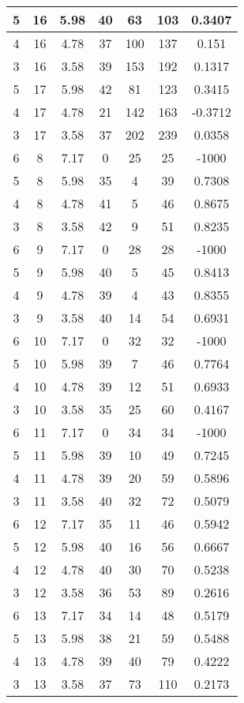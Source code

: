 \documentclass[letterpaper, 12pt]{article}
\begin{document}
\begin{longtable}{|c|c|c|c|c|c|c|}
\hline
5 & 16 & 5.98 & 40 & 63 & 103 & 0.3407 \\
\hline
4 & 16 & 4.78 & 37 & 100 & 137 & 0.151 \\
\hline
3 & 16 & 3.58 & 39 & 153 & 192 & 0.1317 \\
\hline
5 & 17 & 5.98 & 42 & 81 & 123 & 0.3415 \\
\hline
4 & 17 & 4.78 & 21 & 142 & 163 & -0.3712 \\
\hline
3 & 17 & 3.58 & 37 & 202 & 239 & 0.0358 \\
\hline
6 & 8 & 7.17 & 0 & 25 & 25 & -1000 \\
\hline
5 & 8 & 5.98 & 35 & 4 & 39 & 0.7308 \\
\hline
4 & 8 & 4.78 & 41 & 5 & 46 & 0.8675 \\
\hline
3 & 8 & 3.58 & 42 & 9 & 51 & 0.8235 \\
\hline
6 & 9 & 7.17 & 0 & 28 & 28 & -1000 \\
\hline
5 & 9 & 5.98 & 40 & 5 & 45 & 0.8413 \\
\hline
4 & 9 & 4.78 & 39 & 4 & 43 & 0.8355 \\
\hline
3 & 9 & 3.58 & 40 & 14 & 54 & 0.6931 \\
\hline
6 & 10 & 7.17 & 0 & 32 & 32 & -1000 \\
\hline
5 & 10 & 5.98 & 39 & 7 & 46 & 0.7764 \\
\hline
4 & 10 & 4.78 & 39 & 12 & 51 & 0.6933 \\
\hline
3 & 10 & 3.58 & 35 & 25 & 60 & 0.4167 \\
\hline
6 & 11 & 7.17 & 0 & 34 & 34 & -1000 \\
\hline
5 & 11 & 5.98 & 39 & 10 & 49 & 0.7245 \\
\hline
4 & 11 & 4.78 & 39 & 20 & 59 & 0.5896 \\
\hline
3 & 11 & 3.58 & 40 & 32 & 72 & 0.5079 \\
\hline
6 & 12 & 7.17 & 35 & 11 & 46 & 0.5942 \\
\hline
5 & 12 & 5.98 & 40 & 16 & 56 & 0.6667 \\
\hline
4 & 12 & 4.78 & 40 & 30 & 70 & 0.5238 \\
\hline
3 & 12 & 3.58 & 36 & 53 & 89 & 0.2616 \\
\hline
6 & 13 & 7.17 & 34 & 14 & 48 & 0.5179 \\
\hline
5 & 13 & 5.98 & 38 & 21 & 59 & 0.5488 \\
\hline
4 & 13 & 4.78 & 39 & 40 & 79 & 0.4222 \\
\hline
3 & 13 & 3.58 & 37 & 73 & 110 & 0.2173 \\

\end{longtable}
\end{document}

